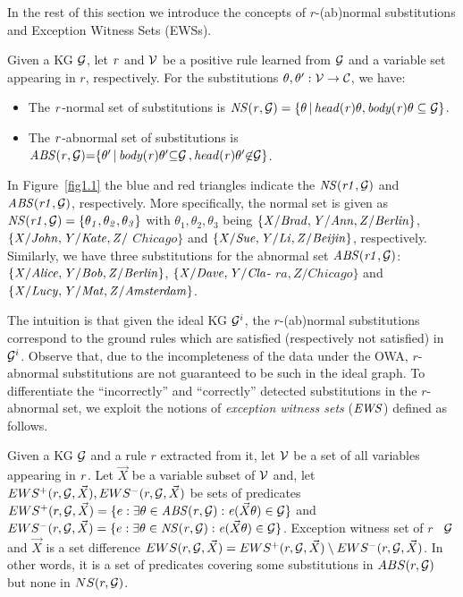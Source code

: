 In the rest of this section we introduce the concepts of $r$-(ab)normal substitutions and Exception Witness Sets (EWSs).

\begin{definition}\label{sec:rulelearn}
Given a KG $\mathcal{G}$, let $\mathit{r}$ and $\mathcal{V}$ be a positive rule learned from $\mathcal{G}$ and a variable set appearing in $r$, respectively. For the substitutions $\theta,\theta':\mathcal{V} \rightarrow \mathcal{C}$, we have:

\begin{itemize}
\item The $\mathit{r}$-normal set of substitutions is $\mathit{NS(r, \mathcal{G})=\{\theta\, |\, head(r)\theta,body(r)\theta \subseteq \mathcal{G}\}}$.
\item The $\mathit{r}$-abnormal set of substitutions is $\mathit{ABS(r, \mathcal{G}){=}\{\theta'\, |\, body(r)\theta'} \mathit{{\subseteq} \mathcal{G}\,{,}\,head(r)\theta' {\not \in} \mathcal{G}\}}$.
\end{itemize}
\end{definition}

\begin{example}\label{ex:abns}
In Figure~\ref{fig1.1} the blue and red triangles indicate the $\mathit{NS(r1,\mathcal{G})}$ and $\mathit{ABS(r1,\mathcal{G})}$, respectively. More specifically, the normal set is given as $\mathit{NS(r1,\mathcal{G})}=\{\mathit{\theta_1,\theta_2,\theta_3}\}$ with $\theta_1,\theta_2,\theta_3$ being $\{\mathit{X/Brad,Y/Ann,Z/Berlin}\}$, $\{\mathit{X/John,Y/Kate,Z/}$ $Chicago\}$ and $\{\mathit{X/Sue,Y/Li,Z/Beijin}\}$, respectively. Similarly, we have three substitutions for the abnormal set $\mathit{ABS(r1,\mathcal{G})}$: $\{\mathit{X/Alice,Y/Bob,Z/Berlin}\}$, $\{\mathit{X/Dave,Y/Cla}$- $ra,Z/Chicago\}$ and $\{\mathit{X/Lucy,Y/Mat,Z/Amsterdam}\}$.
\end{example}

The intuition is that given the ideal KG $\mathcal{G}^i$, the $r$-(ab)normal substitutions correspond to the ground rules which are satisfied (respectively not satisfied) in $\mathcal{G}^i$. Observe that, due to the incompleteness of the data under the OWA, $r$-abnormal substitutions are not guaranteed to be such in the ideal graph. To differentiate the ``incorrectly'' and ``correctly'' detected substitutions in the $r$-abnormal set, we exploit the notions of \emph{exception witness sets} ($\mathit{EWS}$) defined as follows.

\begin{definition} \label{def:ews}
Given a KG $\mathcal{G}$ and a rule $r$ extracted from it, let $\mathcal{V}$ be a set of all variables appearing in $\mathit{r}$. Let $\vec{X}$ be a variable subset of $\mathcal{V}$ and, let $EWS^+(r,\mathcal{G},\vec{X}), EWS^-(r,\mathcal{G},\vec{X})$ be sets of predicates $EWS^+(r,\mathcal{G},\vec{X})=\{e: \exists \theta \in \mathit{ABS(r,\mathcal{G})}: \mathit{e}(\vec{X}\theta)\in \mathcal{G}\}$ and $EWS^-(r,\mathcal{G},\vec{X})=\{e: \exists \theta \in \mathit{NS(r,\mathcal{G})}: \mathit{e}(\vec{X}\theta)\in \mathcal{G}\}$. Exception witness set of $r$ \wrt\ $\mathcal{G}$ and $\vec{X}$ is a set difference $EWS(r,\mathcal{G},\vec{X})=EWS^+(r,\mathcal{G},\vec{X}) \setminus EWS^-(r,\mathcal{G},\vec{X})$. In other words, it is a set of predicates covering some substitutions in $ABS(r, \mathcal{G})$ but none in $NS(r, \mathcal{G})$.
\end{definition}

